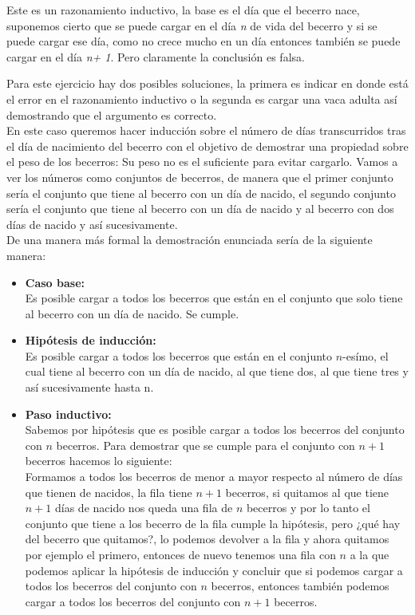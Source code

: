 \documentclass[spanish,12pt,letterpaper]{article}
\begin{document}
Este es un razonamiento inductivo, la base es el día que el becerro nace,
suponemos cierto que se puede cargar en el día \textit{n} de vida del becerro y
si se puede cargar ese día, como no crece mucho en un día entonces también se
puede cargar en el día \textit{n+ 1}.  Pero claramente la conclusión es falsa.

Para este ejercicio hay dos posibles soluciones,  la primera es indicar en donde
está el error en el razonamiento inductivo o la segunda es cargar una vaca adulta
así demostrando que el argumento es correcto.\\

\noindent En este caso queremos hacer inducción sobre el número de días transcurridos tras el día de nacimiento del becerro con el objetivo de
demostrar una propiedad sobre el peso de los becerros: Su
peso no es el suficiente para evitar cargarlo. Vamos a ver los números como
conjuntos de becerros, de manera que el primer conjunto sería el conjunto que
tiene al becerro con un día de nacido, el segundo conjunto sería el conjunto
que tiene al becerro con un día de nacido y al becerro con dos días de nacido y
así sucesivamente.\\
De una manera más formal la demostración enunciada sería de la
siguiente manera:\\

\begin{itemize}
\item \textbf{Caso base:}\\
Es posible cargar a todos los becerros que están en el conjunto que solo tiene
al becerro con un día de nacido. Se cumple.

\item \textbf{Hipótesis de inducción:}\\
Es posible cargar a todos los becerros que están en el conjunto $n$-esímo, el
cual tiene al becerro con un día de nacido, al que tiene dos, al que tiene tres
y así sucesivamente hasta n.

\item \textbf{Paso inductivo:}\\
Sabemos por hipótesis que es posible cargar a todos los becerros del conjunto
con $n$ becerros. Para demostrar que se cumple para el conjunto con $n+1$
becerros hacemos lo siguiente:\\
Formamos a todos los becerros de menor a mayor respecto al número de días que
tienen de nacidos, la fila tiene $n+1$ becerros, si quitamos al que tiene
$n+1$ días de nacido nos queda una fila de $n$ becerros y por lo tanto el conjunto que tiene a los becerro de la fila cumple
la hipótesis, pero ¿qué hay del becerro que quitamos?, lo podemos devolver a la
fila y ahora quitamos por ejemplo el primero, entonces de nuevo
tenemos una fila con $n$ a la que podemos aplicar la hipótesis de inducción y
concluir que si podemos cargar a todos los becerros del conjunto con $n$
becerros, entonces también podemos cargar a todos los becerros del conjunto con
$n+1$ becerros.
\end{itemize}
\end{document}
